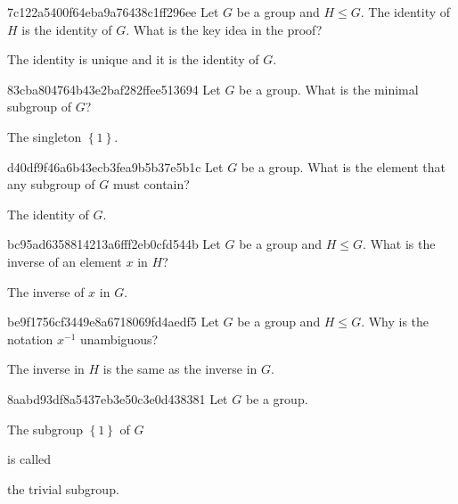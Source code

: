 \begin{note}{7c122a5400f64eba9a76438c1ff296ee}
    Let \({ G }\) be a group and \({ H \leq G }\).
    The identity of \({ H }\) is the identity of \({ G }\).
    What is the key idea in the proof?

    \begin{cloze}{1}
        The identity is unique and it is the identity of \({ G }\).
    \end{cloze}
\end{note}

\begin{note}{83cba804764b43e2baf282ffee513694}
    Let \({ G }\) be a group.
    What is the minimal subgroup of \({ G }\)?

    \begin{cloze}{1}
        The singleton \({ \left\{ 1 \right\} }\).
    \end{cloze}
\end{note}

\begin{note}{d40df9f46a6b43ecb3fea9b5b37e5b1c}
    Let \({ G }\) be a group.
    What is the element that any subgroup of \({ G }\) must contain?

    \begin{cloze}{1}
        The identity of \({ G }\).
    \end{cloze}
\end{note}

\begin{note}{bc95ad6358814213a6fff2eb0cfd544b}
    Let \({ G }\) be a group and \({ H \leq G }\).
    What is the inverse of an element \({ x }\) in \({ H }\)?

    \begin{cloze}{1}
        The inverse of \({ x }\) in \({ G }\).
    \end{cloze}
\end{note}

\begin{note}{be9f1756cf3449e8a6718069fd4aedf5}
    Let \({ G }\) be a group and \({ H \leq G }\).
    Why is the notation \({ x^{-1} }\) unambiguous?

    \begin{cloze}{1}
        The inverse in \({ H }\) is the same as the inverse in \({ G }\).
    \end{cloze}
\end{note}

\begin{note}{8aabd93df8a5437eb3e50c3e0d438381}
    Let \({ G }\) be a group.
    \begin{icloze}{2}The subgroup \({ \left\{ 1 \right\} }\) of \({ G }\)\end{icloze} is called \begin{icloze}{1}the trivial subgroup.\end{icloze}
\end{note}

